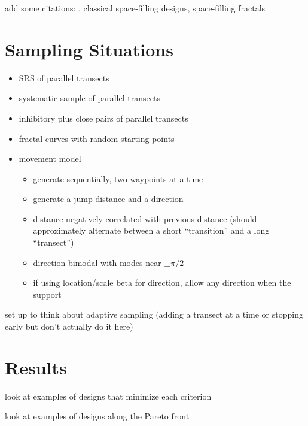 \documentclass[12pt]{article}
\begin{document}
add some citations: \citet{lark}, classical space-filling designs,
space-filling fractals


\section{Sampling Situations}

\begin{itemize}

\item SRS of parallel transects

\item systematic sample of parallel transects

\item inhibitory plus close pairs of parallel transects

\item fractal curves with random starting points

\item movement model
\begin{itemize}
\item generate sequentially, two waypoints at a time
\item generate a jump distance and a direction
\item distance negatively correlated with previous distance (should
approximately alternate between a short ``transition'' and a long ``transect'')
\item direction bimodal with modes near \(\pm \pi / 2\)
\item if using location/scale beta for direction, allow any direction when the
support 
\end{itemize}

\end{itemize}

set up to think about adaptive sampling (adding a transect at a time or
stopping early but don't actually do it here)


\section{Results}

look at examples of designs that minimize each criterion

look at examples of designs along the Pareto front




\end{document}
